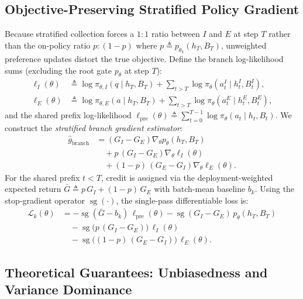 \documentclass[11pt]{article}
\theoremstyle{definition}
\theoremstyle{remark}
\newcommand{\sg}{\operatorname{sg}}
\newcommand{\gbranch}{\widehat{g}_{\mathrm{branch}}}
\begin{document}
\subsection{Objective-Preserving Stratified Policy Gradient}
\label{subsec:estimator}
Because stratified collection forces a $1:1$ ratio between $I$ and $E$ at step $T$ rather than the on-policy ratio $p : (1-p)$ where $p \triangleq p_{\theta_k}(h_T, B_T)$, unweighted preference updates distort the true objective. Define the branch log-likelihood sums (excluding the root gate $p_\theta$ at step $T$):
\begin{align}
    \ell_I(\theta) &\triangleq \log \pi_{\theta, I}(q \mid h_T, B_T) + \sum_{t > T} \log \pi_\theta(a_t^I \mid h_t^I, B_t^I), \label{eq:ell_I}\\
    \ell_E(\theta) &\triangleq \log \pi_{\theta, E}(a \mid h_T, B_T) + \sum_{t > T} \log \pi_\theta(a_t^E \mid h_t^E, B_t^E), \label{eq:ell_E}
\end{align}
and the shared prefix log-likelihood $\ell_{\mathrm{pre}}(\theta) \triangleq \sum_{t=0}^{T-1} \log \pi_\theta(a_t \mid h_t, B_t)$.
We construct the \emph{stratified branch gradient estimator}:
\begin{align}
    \gbranch &= (G_I - G_E)\nabla_\theta p_\theta(h_T, B_T) \nonumber \\
    &\quad + p\,(G_I - G_E)\nabla_\theta \ell_I(\theta) \nonumber \\
    &\quad + (1 - p)\,(G_E - G_I)\nabla_\theta \ell_E(\theta).
    \label{eq:g_branch}
\end{align}
For the shared prefix $t < T$, credit is assigned via the deployment-weighted expected return $\bar{G} \triangleq p\,G_I + (1 - p)\,G_E$ with batch-mean baseline $b_k$. Using the stop-gradient operator $\sg(\cdot)$, the single-pass differentiable loss is:
\begin{align}
    \mathcal{L}_k(\theta) &= -\sg(\bar{G} - b_k)\,\ell_{\mathrm{pre}}(\theta) - \sg(G_I - G_E)\,p_\theta(h_T, B_T) \nonumber \\
    &\quad -\sg\bigl(p\,(G_I - G_E)\bigr)\,\ell_I(\theta) \nonumber \\
    &\quad -\sg\bigl((1 - p)\,(G_E - G_I)\bigr)\,\ell_E(\theta).
    \label{eq:loss}
\end{align}

\subsection{Theoretical Guarantees: Unbiasedness and Variance Dominance}
\label{subsec:theory}
\end{document}
